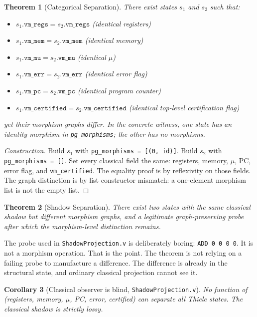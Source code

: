 \documentclass[11pt,a4paper]{article}
\theoremstyle{plain}
\newtheorem{theorem}{Theorem}[section]
\newtheorem{corollary}[theorem]{Corollary}
\theoremstyle{definition}
\theoremstyle{remark}
\begin{document}
\begin{theorem}[Categorical Separation]
\label{thm:sep}
There exist states $s_1$ and $s_2$ such that:
\begin{itemize}
\item $s_1.\texttt{vm\_regs} = s_2.\texttt{vm\_regs}$ (identical registers)
\item $s_1.\texttt{vm\_mem} = s_2.\texttt{vm\_mem}$ (identical memory)
\item $s_1.\texttt{vm\_mu} = s_2.\texttt{vm\_mu}$ (identical $\mu$)
\item $s_1.\texttt{vm\_err} = s_2.\texttt{vm\_err}$ (identical error flag)
\item $s_1.\texttt{vm\_pc} = s_2.\texttt{vm\_pc}$ (identical program counter)
\item $s_1.\texttt{vm\_certified} = s_2.\texttt{vm\_certified}$ (identical top-level certification flag)
\end{itemize}
yet their morphism graphs differ. In the concrete witness, one state has an identity morphism in \texttt{pg\_morphisms}; the other has no morphisms.
\end{theorem}

\begin{proof}[Construction]
Build $s_1$ with \texttt{pg\_morphisms = [(0, id)]}. Build $s_2$ with \texttt{pg\_morphisms = []}. Set every classical field the same: registers, memory, $\mu$, PC, error flag, and \texttt{vm\_certified}. The equality proof is by reflexivity on those fields. The graph distinction is by list constructor mismatch: a one-element morphism list is not the empty list.
\end{proof}

\begin{theorem}[Shadow Separation]
There exist two states with the same classical shadow but different morphism graphs, and a legitimate graph-preserving probe after which the morphism-level distinction remains.
\end{theorem}

The probe used in \texttt{ShadowProjection.v} is deliberately boring: \texttt{ADD 0 0 0 0}. It is not a morphism operation. That is the point. The theorem is not relying on a failing probe to manufacture a difference. The difference is already in the structural state, and ordinary classical projection cannot see it.

\begin{corollary}[Classical observer is blind, \texttt{ShadowProjection.v}]
No function of (registers, memory, $\mu$, PC, error, certified) can separate all Thiele states. The classical shadow is strictly lossy.
\end{corollary}
\end{document}

